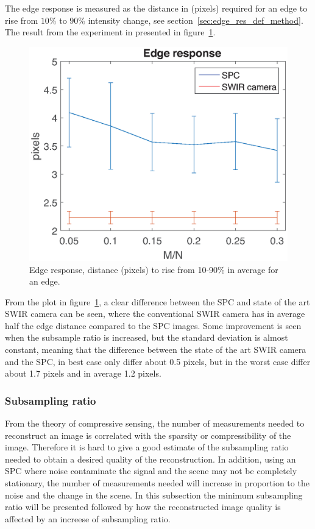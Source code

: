The edge response is measured as the distance in (pixels) required for an edge to rise from $10\%$ to $90\%$ intensity change, see section~\ref{sec:edge_res_def_method}. The result from the experiment in presented in figure~\ref{fig:rise}. 

\begin{figure}[H]
    \centering
    \includegraphics[width=0.7\linewidth]{result/mtf/Rise10_90.eps}
    \caption{Edge response, distance (pixels) to rise from 10-90\% in average for an edge.}
    \label{fig:rise}
\end{figure}

From the plot in figure~\ref{fig:rise}, a clear difference between the SPC and state of the art SWIR camera can be seen, where the conventional SWIR camera has in average half the edge distance compared to the SPC images. Some improvement is seen when the subsample ratio is increased, but the standard deviation is almost constant, meaning that the difference between the state of the art SWIR camera and the SPC, in best case only differ about 0.5 pixels, but in the worst case differ about 1.7 pixels and in average 1.2 pixels.

\subsubsection{Subsampling ratio}
\label{sec:measurements}
From the theory of compressive sensing, the number of measurements needed to reconstruct an image is correlated with the sparsity or compressibility of the image. Therefore it is hard to give a good estimate of the subsampling ratio needed to obtain a desired quality of the reconstruction. In addition, using an SPC where noise contaminate the signal and the scene may not be completely stationary, the number of measurements needed will increase in proportion to the noise and the change in the scene. In this subsection the minimum subsampling ratio will be presented followed by how the reconstructed image quality is affected by an increese of subsampling ratio.\\[0.1in]


